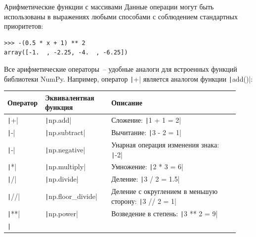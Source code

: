 \documentclass[aspectratio=169, mathserif]{beamer}	%
\begin{document}
\begin{frame}[fragile]{Арифметические функции с массивами}
\scriptsize
Данные операции могут быть использованы в выражениях любыми способами с соблюдением стандартных приоритетов:

\begin{verbatim}
>>> -(0.5 * x + 1) ** 2
array([-1.  , -2.25, -4.  , -6.25])
\end{verbatim}

Все арифметические операторы~-- удобные аналоги для встроенных функций библиотеки NumPy. Например, оператор \texttt|+| является аналогом функции \texttt|add()|:

\begin{table}[h!]
\label{tab:арифм.опер.np}
\begin{tabular*}{\linewidth}{p{0.11\linewidth}p{0.28\linewidth}p{0.54\linewidth}}
\hline
{Оператор} & {Эквивалентная функция} & {Описание} \\
\hline

\texttt|+| & \texttt|np.add| & Сложение: \texttt|1 + 1 = 2| \\

\texttt|-| & \texttt|np.subtract| & Вычитание: \texttt|3 - 2 = 1| \\

\texttt|-| & \texttt|np.negative| & Унарная операция изменения знака: \texttt|-2| \\

\texttt|*| & \texttt|np.multiply| & Умножение: \texttt|2 * 3 = 6| \\

\texttt|/| & \texttt|np.divide| & Деление: \texttt|3 / 2 = 1.5| \\

\texttt|//| & \texttt|np.floor_divide| & Деление с округлением в меньшую сторону: \texttt|3 // 2 = 1| \\

\texttt|**| & \texttt|np.power| & Возведение в степень: \texttt|3 ** 2 = 9| \\

\texttt|%
\hline
\end{tabular*}
\end{table}
\vfil
\end{frame}
\end{document}
